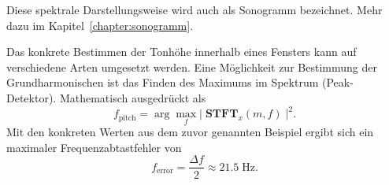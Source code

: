 Diese spektrale Darstellungsweise wird auch als Sonogramm bezeichnet.
%
Mehr dazu im Kapitel~\ref{chapter:sonogramm}.

Das konkrete Bestimmen der Tonhöhe innerhalb eines Fensters kann auf verschiedene Arten umgesetzt werden.
Eine Möglichkeit zur Bestimmung der Grundharmonischen ist das Finden des Maximums im Spektrum (Peak-Detektor).
Mathematisch ausgedrückt als
\begin{equation}
    f_{\text{pitch}}
    =
    \arg\max_f \left| \; \mathbf{STFT}_x(m, f) \; \right|^2.
\end{equation}
Mit den konkreten Werten aus dem zuvor genannten Beispiel ergibt sich ein maximaler Frequenzabtastfehler von
\begin{equation}
    f_{\text{error}}
    =
    \frac{\Delta f}{2}
    \approx
    21.5\;\text{Hz}.
\end{equation}


